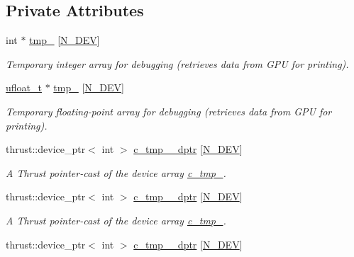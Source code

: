 \subsection*{Private Attributes}
\begin{DoxyCompactItemize}
\item 
int $\ast$ \hyperlink{classMesh_a7bd12663f1a162d1992ccd63a80197ca}{tmp\+\_} \mbox{[}\hyperlink{cppspec_8h_a2b674dab7a14f1bf32b48b7fda5022dc}{N\+\_\+\+D\+EV}\mbox{]}
\begin{DoxyCompactList}\small\item\em Temporary integer array for debugging (retrieves data from G\+PU for printing). \end{DoxyCompactList}\item 
\hyperlink{cppspec_8h_af529d360dfac9b9578aa719418a53a21}{ufloat\+\_\+t} $\ast$ \hyperlink{classMesh_ad58f3cf697a92987d99ee30269e1f873}{tmp\+\_} \mbox{[}\hyperlink{cppspec_8h_a2b674dab7a14f1bf32b48b7fda5022dc}{N\+\_\+\+D\+EV}\mbox{]}
\begin{DoxyCompactList}\small\item\em Temporary floating-\/point array for debugging (retrieves data from G\+PU for printing). \end{DoxyCompactList}\item 
thrust\+::device\+\_\+ptr$<$ int $>$ \hyperlink{classMesh_a41b9976bd2ef8d8776c5f1e92c97cc89}{c\+\_\+tmp\+\_\+\_\+dptr} \mbox{[}\hyperlink{cppspec_8h_a2b674dab7a14f1bf32b48b7fda5022dc}{N\+\_\+\+D\+EV}\mbox{]}
\begin{DoxyCompactList}\small\item\em A Thrust pointer-\/cast of the device array \hyperlink{classMesh_a2d6d66223791e211c83a72f9114f8845}{c\+\_\+tmp\+\_}. \end{DoxyCompactList}\item 
thrust\+::device\+\_\+ptr$<$ int $>$ \hyperlink{classMesh_aad2ad266ce1e7ccc6fef15a302a99d39}{c\+\_\+tmp\+\_\+\_\+dptr} \mbox{[}\hyperlink{cppspec_8h_a2b674dab7a14f1bf32b48b7fda5022dc}{N\+\_\+\+D\+EV}\mbox{]}
\begin{DoxyCompactList}\small\item\em A Thrust pointer-\/cast of the device array \hyperlink{classMesh_a167ed8797ff5b96dc9c50fef4061abfb}{c\+\_\+tmp\+\_}. \end{DoxyCompactList}\item 
thrust\+::device\+\_\+ptr$<$ int $>$ \hyperlink{classMesh_a031a78e18093c0a87d6171f7840d8ce0}{c\+\_\+tmp\+\_\+\_\+dptr} \mbox{[}\hyperlink{cppspec_8h_a2b674dab7a14f1bf32b48b7fda5022dc}{N\+\_\+\+D\+EV}\mbox{]}

\end{DoxyCompactItemize}
